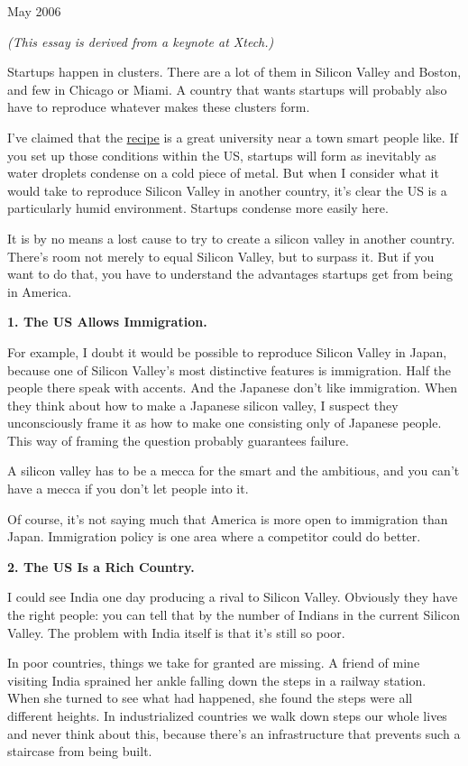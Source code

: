 May 2006

\emph{(This essay is derived from a keynote at Xtech.)}

Startups happen in clusters. There are a lot of them in Silicon Valley
and Boston, and few in Chicago or Miami. A country that wants startups
will probably also have to reproduce whatever makes these clusters form.

I've claimed that the \href{siliconvalley.html}{recipe} is a great
university near a town smart people like. If you set up those conditions
within the US, startups will form as inevitably as water droplets
condense on a cold piece of metal. But when I consider what it would
take to reproduce Silicon Valley in another country, it's clear the US
is a particularly humid environment. Startups condense more easily here.

It is by no means a lost cause to try to create a silicon valley in
another country. There's room not merely to equal Silicon Valley, but to
surpass it. But if you want to do that, you have to understand the
advantages startups get from being in America.

\textbf{1. The US Allows Immigration.}

For example, I doubt it would be possible to reproduce Silicon Valley in
Japan, because one of Silicon Valley's most distinctive features is
immigration. Half the people there speak with accents. And the Japanese
don't like immigration. When they think about how to make a Japanese
silicon valley, I suspect they unconsciously frame it as how to make one
consisting only of Japanese people. This way of framing the question
probably guarantees failure.

A silicon valley has to be a mecca for the smart and the ambitious, and
you can't have a mecca if you don't let people into it.

Of course, it's not saying much that America is more open to immigration
than Japan. Immigration policy is one area where a competitor could do
better.

\textbf{2. The US Is a Rich Country.}

I could see India one day producing a rival to Silicon Valley. Obviously
they have the right people: you can tell that by the number of Indians
in the current Silicon Valley. The problem with India itself is that
it's still so poor.

In poor countries, things we take for granted are missing. A friend of
mine visiting India sprained her ankle falling down the steps in a
railway station. When she turned to see what had happened, she found the
steps were all different heights. In industrialized countries we walk
down steps our whole lives and never think about this, because there's
an infrastructure that prevents such a staircase from being built.

